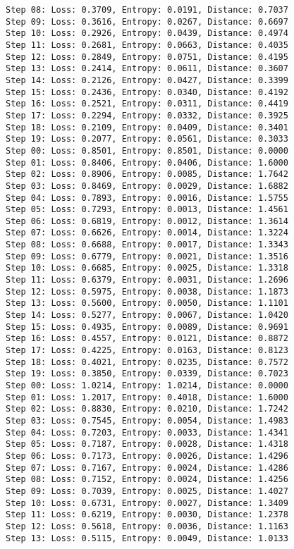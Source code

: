 \documentclass[11pt]{article}
\begin{document}
\begin{Verbatim}[commandchars=\\\{\}]
Step 08: Loss: 0.3709, Entropy: 0.0191, Distance: 0.7037
Step 09: Loss: 0.3616, Entropy: 0.0267, Distance: 0.6697
Step 10: Loss: 0.2926, Entropy: 0.0439, Distance: 0.4974
Step 11: Loss: 0.2681, Entropy: 0.0663, Distance: 0.4035
Step 12: Loss: 0.2849, Entropy: 0.0751, Distance: 0.4195
Step 13: Loss: 0.2414, Entropy: 0.0611, Distance: 0.3607
Step 14: Loss: 0.2126, Entropy: 0.0427, Distance: 0.3399
Step 15: Loss: 0.2436, Entropy: 0.0340, Distance: 0.4192
Step 16: Loss: 0.2521, Entropy: 0.0311, Distance: 0.4419
Step 17: Loss: 0.2294, Entropy: 0.0332, Distance: 0.3925
Step 18: Loss: 0.2109, Entropy: 0.0409, Distance: 0.3401
Step 19: Loss: 0.2077, Entropy: 0.0561, Distance: 0.3033
Step 00: Loss: 0.8501, Entropy: 0.8501, Distance: 0.0000
Step 01: Loss: 0.8406, Entropy: 0.0406, Distance: 1.6000
Step 02: Loss: 0.8906, Entropy: 0.0085, Distance: 1.7642
Step 03: Loss: 0.8469, Entropy: 0.0029, Distance: 1.6882
Step 04: Loss: 0.7893, Entropy: 0.0016, Distance: 1.5755
Step 05: Loss: 0.7293, Entropy: 0.0013, Distance: 1.4561
Step 06: Loss: 0.6819, Entropy: 0.0012, Distance: 1.3614
Step 07: Loss: 0.6626, Entropy: 0.0014, Distance: 1.3224
Step 08: Loss: 0.6688, Entropy: 0.0017, Distance: 1.3343
Step 09: Loss: 0.6779, Entropy: 0.0021, Distance: 1.3516
Step 10: Loss: 0.6685, Entropy: 0.0025, Distance: 1.3318
Step 11: Loss: 0.6379, Entropy: 0.0031, Distance: 1.2696
Step 12: Loss: 0.5975, Entropy: 0.0038, Distance: 1.1873
Step 13: Loss: 0.5600, Entropy: 0.0050, Distance: 1.1101
Step 14: Loss: 0.5277, Entropy: 0.0067, Distance: 1.0420
Step 15: Loss: 0.4935, Entropy: 0.0089, Distance: 0.9691
Step 16: Loss: 0.4557, Entropy: 0.0121, Distance: 0.8872
Step 17: Loss: 0.4225, Entropy: 0.0163, Distance: 0.8123
Step 18: Loss: 0.4021, Entropy: 0.0235, Distance: 0.7572
Step 19: Loss: 0.3850, Entropy: 0.0339, Distance: 0.7023
Step 00: Loss: 1.0214, Entropy: 1.0214, Distance: 0.0000
Step 01: Loss: 1.2017, Entropy: 0.4018, Distance: 1.6000
Step 02: Loss: 0.8830, Entropy: 0.0210, Distance: 1.7242
Step 03: Loss: 0.7545, Entropy: 0.0054, Distance: 1.4983
Step 04: Loss: 0.7203, Entropy: 0.0033, Distance: 1.4341
Step 05: Loss: 0.7187, Entropy: 0.0028, Distance: 1.4318
Step 06: Loss: 0.7173, Entropy: 0.0026, Distance: 1.4296
Step 07: Loss: 0.7167, Entropy: 0.0024, Distance: 1.4286
Step 08: Loss: 0.7152, Entropy: 0.0024, Distance: 1.4256
Step 09: Loss: 0.7039, Entropy: 0.0025, Distance: 1.4027
Step 10: Loss: 0.6731, Entropy: 0.0027, Distance: 1.3409
Step 11: Loss: 0.6219, Entropy: 0.0030, Distance: 1.2378
Step 12: Loss: 0.5618, Entropy: 0.0036, Distance: 1.1163
Step 13: Loss: 0.5115, Entropy: 0.0049, Distance: 1.0133

\end{Verbatim}
\end{document}
